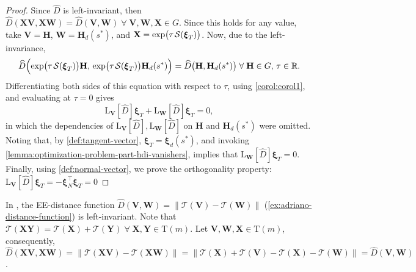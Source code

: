 \begin{proof}
    Since $\widehat{D}$ is left-invariant, then $\widehat{D}(\mathbf{X}\mathbf{V}, \mathbf{X}\mathbf{W})=\widehat{D}(\mathbf{V}, \mathbf{W})\;\forall\;\mathbf{V}, \mathbf{W}, \mathbf{X}\in G$. Since this holds for any value, take $\mathbf{V}=\mathbf{H}$, $\mathbf{W}=\mathbf{H}_d(s^*)$, and $\mathbf{X}=\exp\bigl(\tau\SL[\boldsymbol{\xi}_T]\bigr)$. Now, due to the left-invariance,
    \begin{align}
        \widehat{D}\Bigl(\exp\bigl(\tau\SL[\boldsymbol{\xi}_T]\bigr)\mathbf{H},\, \exp\bigl(\tau\SL[\boldsymbol{\xi}_T]\bigr)\mathbf{H}_d(s^*)\Bigr)
        =\widehat{D}\bigl(\mathbf{H}, \mathbf{H}_d(s^*)\bigr) \;\forall\;\mathbf{H}\in G,\,\tau\in\mathbb{R}.
    \end{align}
    Differentiating both sides of this equation with respect to $\tau$, using \cref{corol:corol1}, and evaluating at $\tau=0$ gives
    \begin{equation}
        \text{L}_{\mathbf{V}}[\widehat{D}]\boldsymbol{\xi}_T {+}\text{L}_{\mathbf{W}}[\widehat{D}]\boldsymbol{\xi}_T= 0, 
    \end{equation}
    in which the dependencies of $\text{L}_{\mathbf{V}}[\widehat{D}], \text{L}_{\mathbf{W}}[\widehat{D}]$ on $\mathbf{H}$ and $\mathbf{H}_d(s^*)$ were omitted. Noting that, by \cref{def:tangent-vector}, $\boldsymbol{\xi}_T = \boldsymbol{\xi}_d(s^*)$, and invoking \cref{lemma:optimization-problem-part-hdi-vanishers}, implies that $\text{L}_{\mathbf{W}}[\widehat{D}]\boldsymbol{\xi}_T = 0$.
    Finally, using \cref{def:normal-vector}, we prove the orthogonality property: $\text{L}_{\mathbf{V}}[\widehat{D}]\boldsymbol{\xi}_T = -\boldsymbol{\xi}_N^{\top}\boldsymbol{\xi}_T=0$ 
\end{proof}
\begin{example}
    In \citet{Rezende2022}, the  EE-distance function $\widehat{D}(\mathbf{V}, \mathbf{W}) = \|\mathcal{T}(\mathbf{V}) - \mathcal{T}(\mathbf{W})\|$ (\cref{ex:adriano-distance-function}) is left-invariant. Note that $\mathcal{T}(\mathbf{X}\mathbf{Y}) = \mathcal{T}(\mathbf{X}) + \mathcal{T}(\mathbf{Y})\;\forall\;\mathbf{X},\mathbf{Y}\in\text{T}(m)$. Let $\mathbf{V}, \mathbf{W}, \mathbf{X} \in \text{T}(m)$, consequently, $\widehat{D}(\mathbf{X}\mathbf{V}, \mathbf{X}\mathbf{W}) = \|\mathcal{T}(\mathbf{X}\mathbf{V}) - \mathcal{T}(\mathbf{X}\mathbf{W})\| = \|\mathcal{T}(\mathbf{X}) + \mathcal{T}(\mathbf{V}) - \mathcal{T}(\mathbf{X}) - \mathcal{T}(\mathbf{W})\| = \widehat{D}(\mathbf{V}, \mathbf{W})$.
\end{example}
